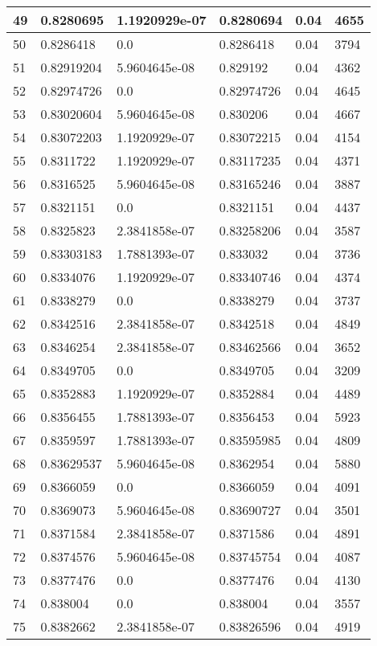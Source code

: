 \begin{longtable}{|l|l|l|l|l|l|}
49 & 0.8280695 & 1.1920929e-07 & 0.8280694 & 0.04 & 4655 \\ \hline 
50 & 0.8286418 & 0.0 & 0.8286418 & 0.04 & 3794 \\ \hline 
51 & 0.82919204 & 5.9604645e-08 & 0.829192 & 0.04 & 4362 \\ \hline 
52 & 0.82974726 & 0.0 & 0.82974726 & 0.04 & 4645 \\ \hline 
53 & 0.83020604 & 5.9604645e-08 & 0.830206 & 0.04 & 4667 \\ \hline 
54 & 0.83072203 & 1.1920929e-07 & 0.83072215 & 0.04 & 4154 \\ \hline 
55 & 0.8311722 & 1.1920929e-07 & 0.83117235 & 0.04 & 4371 \\ \hline 
56 & 0.8316525 & 5.9604645e-08 & 0.83165246 & 0.04 & 3887 \\ \hline 
57 & 0.8321151 & 0.0 & 0.8321151 & 0.04 & 4437 \\ \hline 
58 & 0.8325823 & 2.3841858e-07 & 0.83258206 & 0.04 & 3587 \\ \hline 
59 & 0.83303183 & 1.7881393e-07 & 0.833032 & 0.04 & 3736 \\ \hline 
60 & 0.8334076 & 1.1920929e-07 & 0.83340746 & 0.04 & 4374 \\ \hline 
61 & 0.8338279 & 0.0 & 0.8338279 & 0.04 & 3737 \\ \hline 
62 & 0.8342516 & 2.3841858e-07 & 0.8342518 & 0.04 & 4849 \\ \hline 
63 & 0.8346254 & 2.3841858e-07 & 0.83462566 & 0.04 & 3652 \\ \hline 
64 & 0.8349705 & 0.0 & 0.8349705 & 0.04 & 3209 \\ \hline 
65 & 0.8352883 & 1.1920929e-07 & 0.8352884 & 0.04 & 4489 \\ \hline 
66 & 0.8356455 & 1.7881393e-07 & 0.8356453 & 0.04 & 5923 \\ \hline 
67 & 0.8359597 & 1.7881393e-07 & 0.83595985 & 0.04 & 4809 \\ \hline 
68 & 0.83629537 & 5.9604645e-08 & 0.8362954 & 0.04 & 5880 \\ \hline 
69 & 0.8366059 & 0.0 & 0.8366059 & 0.04 & 4091 \\ \hline 
70 & 0.8369073 & 5.9604645e-08 & 0.83690727 & 0.04 & 3501 \\ \hline 
71 & 0.8371584 & 2.3841858e-07 & 0.8371586 & 0.04 & 4891 \\ \hline 
72 & 0.8374576 & 5.9604645e-08 & 0.83745754 & 0.04 & 4087 \\ \hline 
73 & 0.8377476 & 0.0 & 0.8377476 & 0.04 & 4130 \\ \hline 
74 & 0.838004 & 0.0 & 0.838004 & 0.04 & 3557 \\ \hline 
75 & 0.8382662 & 2.3841858e-07 & 0.83826596 & 0.04 & 4919 \\ \hline 
\end{longtable}